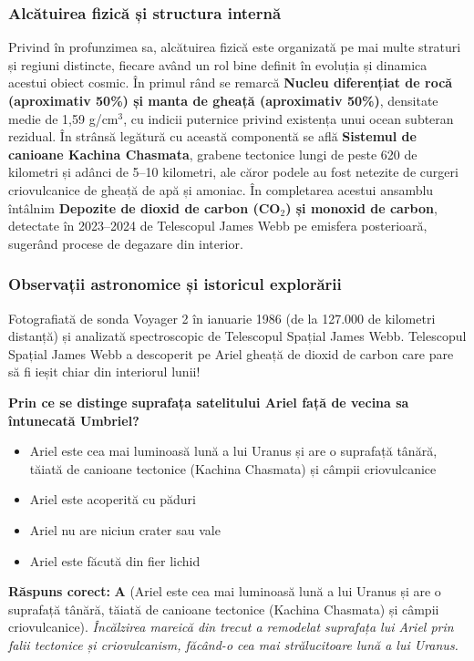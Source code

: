 \subsubsection*{Alcătuirea fizică și structura internă}
Privind în profunzimea sa, alcătuirea fizică este organizată pe mai multe straturi și regiuni distincte, fiecare având un rol bine definit în evoluția și dinamica acestui obiect cosmic. În primul rând se remarcă \textbf{Nucleu diferențiat de rocă (aproximativ 50\%) și manta de gheață (aproximativ 50\%)}, densitate medie de 1,59 g/cm$^3$, cu indicii puternice privind existența unui ocean subteran rezidual. În strânsă legătură cu această componentă se află \textbf{Sistemul de canioane Kachina Chasmata}, grabene tectonice lungi de peste 620 de kilometri și adânci de 5--10 kilometri, ale căror podele au fost netezite de curgeri criovulcanice de gheață de apă și amoniac. În completarea acestui ansamblu întâlnim \textbf{Depozite de dioxid de carbon (CO$_2$) și monoxid de carbon}, detectate în 2023--2024 de Telescopul James Webb pe emisfera posterioară, sugerând procese de degazare din interior.

\subsubsection*{Observații astronomice și istoricul explorării}
Fotografiată de sonda Voyager 2 în ianuarie 1986 (de la 127.000 de kilometri distanță) și analizată spectroscopic de Telescopul Spațial James Webb. Telescopul Spațial James Webb a descoperit pe Ariel gheață de dioxid de carbon care pare să fi ieșit chiar din interiorul lunii!

\vspace{6pt}
\begin{tcolorbox}[orbitarquiz, title={\textbf{Întrebare de verificare \#26: Ariel}}]
\textbf{Prin ce se distinge suprafața satelitului Ariel față de vecina sa întunecată Umbriel?}
\begin{itemize}[leftmargin=2.2em, itemsep=2pt, topsep=4pt]
  \item[$\square$ \textbf{A.}] Ariel este cea mai luminoasă lună a lui Uranus și are o suprafață tânără, tăiată de canioane tectonice (Kachina Chasmata) și câmpii criovulcanice
  \item[$\square$ \textbf{B.}] Ariel este acoperită cu păduri
  \item[$\square$ \textbf{C.}] Ariel nu are niciun crater sau vale
  \item[$\square$ \textbf{D.}] Ariel este făcută din fier lichid
\end{itemize}
\vspace{2pt}
{\footnotesize\color{orbitarMuted}\textbf{Răspuns corect:} \textbf{A} (Ariel este cea mai luminoasă lună a lui Uranus și are o suprafață tânără, tăiată de canioane tectonice (Kachina Chasmata) și câmpii criovulcanice). \emph{Încălzirea mareică din trecut a remodelat suprafața lui Ariel prin falii tectonice și criovulcanism, făcând-o cea mai strălucitoare lună a lui Uranus.}}
\end{tcolorbox}
\clearpage


